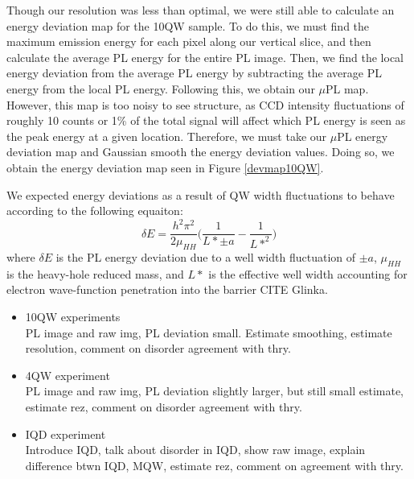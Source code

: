 \indent Though our resolution was less than optimal, we were still able to calculate an energy deviation map for the 10QW sample. To do this, we must find the maximum emission energy for each pixel along our vertical slice, and then calculate the average PL energy for the entire PL image. Then, we find the local energy deviation from the average PL energy by subtracting the average PL energy from the local PL energy. Following this, we obtain our $\mu$PL map. However, this map is too noisy to see structure, as CCD intensity fluctuations of roughly 10 counts or 1\% of the total signal will affect which PL energy is seen as the peak energy at a given location. Therefore, we must take our $\mu$PL energy deviation map and Gaussian smooth the energy deviation values. Doing so, we obtain the energy deviation map seen in Figure \ref{devmap10QW}.


\indent We expected energy deviations as a result of QW width fluctuations to behave according to the following equaiton:
\begin{equation}
\delta E = \frac{h^2 \pi^2}{2 \mu_{HH}}\Big ( \frac{1}{L* \pm a}- \frac{1}{L*^2} \Big )
\end{equation}
where $\delta E$ is the PL energy deviation due to a well width fluctuation of $\pm a$, $\mu_{HH}$ is the heavy-hole reduced mass, and $L*$ is the effective well width accounting for electron wave-function penetration into the barrier CITE Glinka. 

\begin{itemize}
\item 10QW experiments\\
\* PL image and raw img, PL deviation small. Estimate smoothing, estimate resolution, comment on disorder agreement with thry.
\item 4QW experiment\\
\* PL image and raw img, PL deviation slightly larger, but still small estimate, estimate rez, comment on disorder agreement with thry.
\item IQD experiment\\
\* Introduce IQD, talk about disorder in IQD, show raw image, explain difference btwn IQD, MQW, estimate rez, comment on agreement with thry.


\end{itemize}
